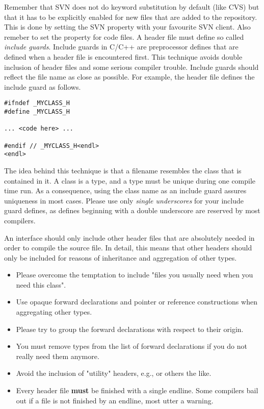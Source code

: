 Remember that SVN does not do keyword substitution by default (like CVS) but that it has to be explicitly enabled for new files that are added to the repository. This is done by setting the SVN property  with your favourite SVN client. Also remeber to set the property  for code files.
A header file must define so called \emph{include guards}.
Include guards in C/C++ are preprocessor defines that are defined when a header file is encountered first.
This technique avoids double inclusion of header files and some serious compiler trouble.
Include guards should reflect the file name as close as possible.
For example, the header file  defines the include guard as follows.
\begin{verbatim}
#ifndef _MYCLASS_H
#define _MYCLASS_H

... <code here> ...

#endif // _MYCLASS_H<endl>
<endl>
\end{verbatim}
The idea behind this technique is that a filename resembles the class that is contained in it.
A class is a type, and a type must be unique during one compile time run.
As a consequence, using the class name as an include guard assures uniqueness in most cases.
Please use only \textit{single underscores} for your include guard defines, as defines beginning with a double underscore are reserved by most compilers.


An interface should only include other header files that are absolutely needed in order to compile the source file.
In detail, this means that other headers should only be included for reasons of inheritance and aggregation of other types.
\begin{itemize}
\item Please overcome the temptation to include "files you usually need when you need this class".
\item Use opaque forward declarations and pointer or reference constructions when aggregating other types.
\item Please try to group the forward declarations with respect to their origin.
\item You must remove types from the list of forward declarations if you do not really need them anymore.
\item Avoid the inclusion of "utility" headers, e.g.,  or others the like.
\item Every header file \textbf{must} be finished with a single endline.
Some compilers bail out if a file is not finished by an endline, most utter a warning.
\end{itemize}

